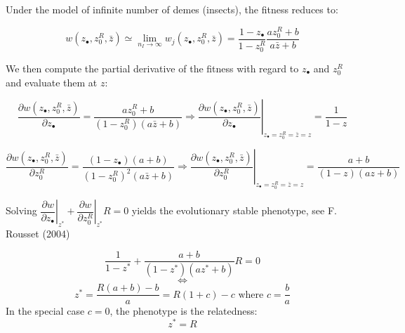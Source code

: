 \documentclass{article}
\begin{document}
  Under the model of infinite number of demes (insects), the fitness reduces to:
  
  \begin{equation}
  w(z_\bullet ,z_0^R , \bar{z} ) \simeq \lim_{n_I \rightarrow \infty} w_j(z_\bullet ,z_0^R , \bar{z} ) = \dfrac{1-z_\bullet}{1- z_0^R}\dfrac{a z_0^R +b }{a \bar{z} +b}
  \end{equation}
  
  We then compute the partial derivative of the fitness with regard to $z_\bullet$ and $z_0^R$ and evaluate them at $z$:
  
  \begin{equation}
  \dfrac{\partial w(z_\bullet ,z_0^R , \bar{z} )}{\partial z_\bullet} = \dfrac{a z_0^R +b }{ (1 - z_0^R) (a \bar{z} +b) } \Rightarrow \left. \dfrac{\partial w(z_\bullet ,z_0^R , \bar{z} )}{\partial z_\bullet} \right\vert_{z_\bullet = z_0^R = \bar{z}=z} = \dfrac{1}{ 1 - z }
  \end{equation}
  
  \begin{equation}
  \dfrac{\partial w(z_\bullet ,z_0^R , \bar{z} )}{\partial z_0^R} = \dfrac{(1- z_\bullet)(a +b)}{(1- z_0^R)^2(a \bar{z} +b)} \Rightarrow \left. \dfrac{\partial w(z_\bullet ,z_0^R , \bar{z} )}{\partial z_0^R} \right\vert_{z_\bullet = z_0^R = \bar{z}=z} = \dfrac{a +b}{(1- z)(a z +b)}
  \end{equation}
  
  Solving $\left. \dfrac{\partial w}{\partial z_\bullet} \right\vert_{z^*} + \left. \dfrac{\partial w}{\partial z_0^R} \right\vert_{z^*} R =0 $ yields the evolutionary stable phenotype, see F. Rousset (2004) 
  
    \begin{equation}
  \dfrac{1}{ 1 - z^* } + \dfrac{a +b}{(1- z^*)(a z^* +b)}R =0
  \end{equation}
  \begin{equation}
  \iff
  \end{equation}
  \begin{equation}
  z^*=\dfrac{R(a+b)-b}{a}=R(1+c)-c \text{ where }c=\dfrac{b}{a}
  \end{equation}
  In the special case $c=0$, the phenotype is the relatedness:
  \begin{equation}
  z^*=R
  \end{equation}
\end{document}
